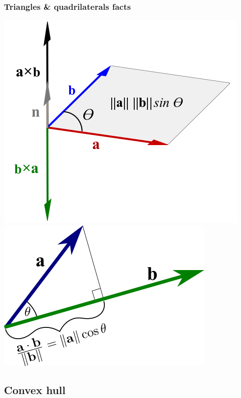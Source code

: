 \documentclass[a4paper]{article}
\begin{document}
\begin{multicols*}{3}
        \subsubsection{Triangles \& quadrilaterals facts}
            
        \includegraphics[width=\linewidth]{images/Cross-product-with-area.png}
        \includegraphics[width=\linewidth]{images/dot_product_projection.png}
    \subsection{Convex hull}
        

\end{multicols*}
\end{document}
